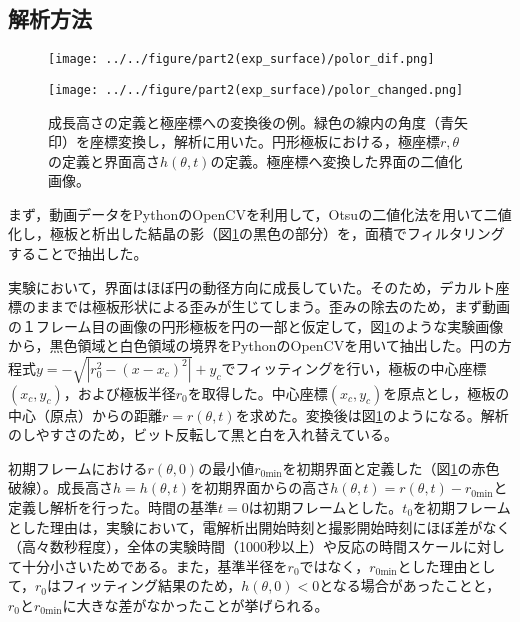 \documentclass[autodetect-engine,dvi=dvipdfmx,a4paper,ja=standard,oneside,openany,11pt]{bxjsbook}
\begin{document}
\subsection{解析方法}
\begin{figure}[htbp]
  \begin{minipage}
    {0.64\textwidth}
    \subcaption{}
    \centering
    \texttt{[image: ../../figure/part2(exp\_surface)/polor\_dif.png]}
    \label{fig:surface_hight_def}
  \end{minipage}
  \begin{minipage}
    {0.32\textwidth}
    \subcaption{}
    \centering
    \texttt{[image: ../../figure/part2(exp\_surface)/polor\_changed.png]}
    \label{fig:polor_changed}
  \end{minipage}
  \caption{成長高さの定義と極座標への変換後の例。緑色の線内の角度（青矢印）を座標変換し，解析に用いた。円形極板における，極座標$r,\theta$の定義と界面高さ$h(\theta,t)$の定義。極座標へ変換した界面の二値化画像。}
  \label{fig:surface_hight_def_polor_changed}
\end{figure}
まず，動画データをPythonのOpenCVを利用して，Otsuの二値化法を用いて二値化し，極板と析出した結晶の影（図\ref{fig:surface_hight_def_polor_changed}の黒色の部分）を，面積でフィルタリングすることで抽出した。

実験において，界面はほぼ円の動径方向に成長していた。そのため，デカルト座標のままでは極板形状による歪みが生じてしまう。歪みの除去のため，まず動画の１フレーム目の画像の円形極板を円の一部と仮定して，図\ref{fig:surface_hight_def_polor_changed}のような実験画像から，黒色領域と白色領域の境界をPythonのOpenCVを用いて抽出した。円の方程式$y=-\sqrt{|r_0^2-(x-x_c)^2|}+y_c$でフィッティングを行い，極板の中心座標$(x_c,y_c)$，および極板半径$r_0$を取得した。中心座標$(x_c,y_c)$を原点とし，極板の中心（原点）からの距離$r=r(\theta,t)$を求めた。変換後は図\ref{fig:surface_hight_def_polor_changed}のようになる。解析のしやすさのため，ビット反転して黒と白を入れ替えている。

初期フレームにおける$r(\theta,0)$の最小値$r_{0\mathrm{min}}$を初期界面と定義した（図\ref{fig:surface_hight_def_polor_changed}の赤色破線）。成長高さ$h=h(\theta,t)$を初期界面からの高さ$h(\theta,t)=r(\theta,t)-r_{0\mathrm{min}}$と定義し解析を行った。時間の基準$t=0$は初期フレームとした。$t_0$を初期フレームとした理由は，実験において，電解析出開始時刻と撮影開始時刻にほぼ差がなく（高々数秒程度），全体の実験時間（1000秒以上）や反応の時間スケールに対して十分小さいためである。また，基準半径を$r_0$ではなく，$r_{0\mathrm{min}}$とした理由として，$r_0$はフィッティング結果のため，$h(\theta,0)<0$となる場合があったことと，$r_0$と$r_{0\mathrm{min}}$に大きな差がなかったことが挙げられる。
\end{document}
